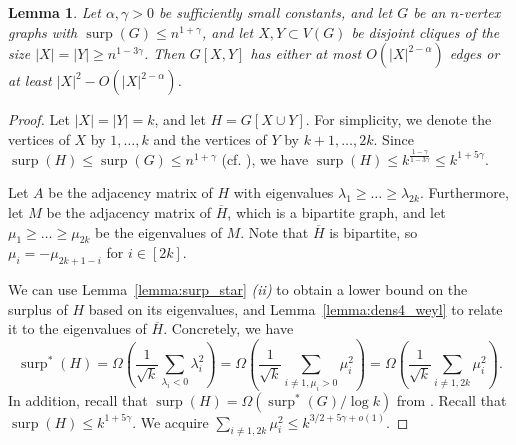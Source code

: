 \documentclass[11pt]{article}
\theoremstyle{plain}
\newtheorem{lemma}[theorem]{Lemma}
\theoremstyle{definition}
\DeclareMathOperator{\surp}{surp}
\begin{document}
\begin{lemma}\label{lemma:bipartite_MaxCut}
    Let $\alpha, \gamma>0$ be sufficiently small constants, and let $G$ be an $n$-vertex graphs with $\surp(G)\leq n^{1+\gamma}$, and let $X, Y\subset V(G)$ be disjoint cliques of the size $|X|=|Y|\geq n^{1-3\gamma}$. 
    Then $G[X, Y]$ has either at most $O(|X|^{2-\alpha})$ edges or at least $|X|^2-O(|X|^{2-\alpha})$.
\end{lemma}
\begin{proof}
Let $|X|=|Y|=k$, and let $H=G[X\cup Y]$. For simplicity, we denote the vertices of $X$ by $1, \dots, k$ and the vertices of $Y$ by $k+1, \dots, 2k$. Since $\surp(H)\leq \surp(G)\leq n^{1+\gamma}$ (cf. ), we have $\surp(H)\leq k^{\frac{1-\gamma}{1-3\gamma}}\leq k^{1+5\gamma}$.

Let $A$ be the adjacency matrix of $H$ with eigenvalues $\lambda_1\geq \dots\geq \lambda_{2k}$. Furthermore, let $M$ be the adjacency matrix of $\overline{H}$, which is a bipartite graph, and let $\mu_1\geq \dots\geq \mu_{2k}$ be the eigenvalues of $M$. 
Note that $\overline{H}$ is bipartite, so $\mu_i=-\mu_{2k+1-i}$ for $i\in [2k]$. 
    
We can use Lemma~\ref{lemma:surp_star} \textit{(ii)} to obtain a lower bound on the surplus of $H$ based on its eigenvalues, and Lemma~\ref{lemma:dens4_weyl} to relate it to the eigenvalues of $\overline{H}$. Concretely, we have
$$\surp^*(H)
    = \Omega\left(\frac{1}{\sqrt{k}}\sum_{\lambda_i<0}\lambda_i^2\right)
    = \Omega\left(\frac{1}{\sqrt{k}}\sum_{i\neq 1,\mu_i>0}\mu_i^2\right)
    =\Omega\left(\frac{1}{\sqrt{k}}\sum_{i\neq 1,2k}\mu_i^2\right).$$
In addition, recall that $\surp(H) = \Omega(\surp^*(G)/\log k)$ from .
Recall that $\surp(H)\leq k^{1+5\gamma}$. 
We acquire $\sum_{i\neq 1, 2k}\mu_i^2 \le k^{3/2+5\gamma+o(1)}$.


\end{proof}
\end{document}
